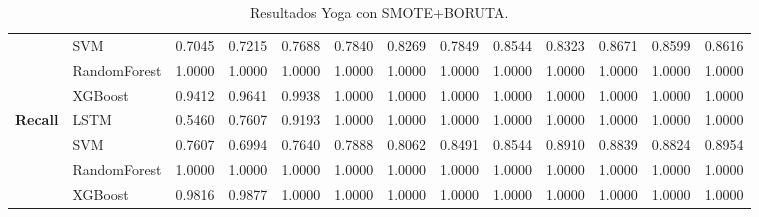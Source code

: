\begin{table}[h]
\begin{adjustbox}{max width=15cm}
\begin{tabular}{|c|l|r|r|r|r|r|r|r|r|r|r|r|}
			& SVM &  0.7045 &  0.7215 &  0.7688 &  0.7840 &  0.8269 &  0.7849 &  0.8544 &  0.8323 &  0.8671 &  0.8599 &  0.8616 \\
			& RandomForest &  1.0000 &  1.0000 &  1.0000 &  1.0000 &  1.0000 &  1.0000 &  1.0000 &  1.0000 &  1.0000 &  1.0000 &  1.0000 \\
			& XGBoost &  0.9412 &  0.9641 &  0.9938 &  1.0000 &  1.0000 &  1.0000 &  1.0000 &  1.0000 &  1.0000 &  1.0000 &  1.0000 \\
			\hline
			\textbf{Recall} & LSTM &  0.5460 &  0.7607 &  0.9193 &  1.0000 &  1.0000 &  1.0000 &  1.0000 &  1.0000 &  1.0000 &  1.0000 &  1.0000 \\
			& SVM &  0.7607 &  0.6994 &  0.7640 &  0.7888 &  0.8062 &  0.8491 &  0.8544 &  0.8910 &  0.8839 &  0.8824 &  0.8954 \\
			& RandomForest &  1.0000 &  1.0000 &  1.0000 &  1.0000 &  1.0000 &  1.0000 &  1.0000 &  1.0000 &  1.0000 &  1.0000 &  1.0000 \\
			& XGBoost &  0.9816 &  0.9877 &  1.0000 &  1.0000 &  1.0000 &  1.0000 &  1.0000 &  1.0000 &  1.0000 &  1.0000 &  1.0000 \\
			\hline
		\end{tabular}
	\end{adjustbox}
	\caption{Resultados Yoga con SMOTE+BORUTA.}
	\label{tab:Yoga_SMOTE_BORUTA}
\end{table}
\newpage
